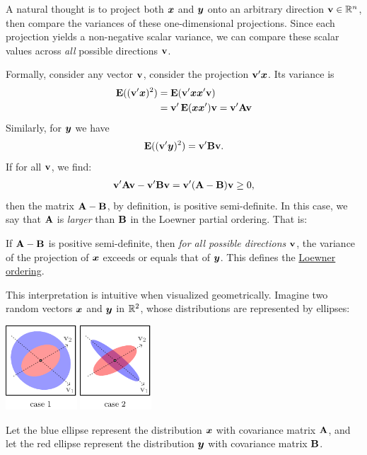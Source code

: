\documentclass[a4paper]{article}
\begin{document}
\begin{multicols}{2}
A natural thought is to project both $\xx$ and $\yy$ onto an arbitrary direction $\vv\in\reals^n$,
then compare the variances of these one-dimensional projections.
Since each projection yields a non-negative scalar variance,
we can compare these scalar values across \emph{all} possible directions $\vv$.

Formally, consider any vector $\vv$,
consider the projection $\vv\T\xx$.
Its variance is
\begin{align*}
	\E((\vv\T \xx)^2)
	&= \E(\vv\T \xx\xx\T\vv) \\
	&= \vv\T\E(\xx\xx\T)\vv
	= \vv\T \AA\vv
\end{align*}
Similarly, for $\yy$ we have
\begin{align*}
	\E((\vv\T \yy)^2)
	= \vv\T \BB\vv.
\end{align*}
If for all $\vv$, we find:
\begin{align*}
	\vv\T \AA\vv - \vv\T \BB\vv
	= \vv\T (\AA - \BB)\vv
	\geq 0,
\end{align*}
then the matrix $\AA-\BB$, by definition, is positive semi-definite.
In this case, we say that $\AA$ is \emph{larger} than $\BB$ in the Loewner partial ordering. That is:
\begin{tcolorbox}[enhanced,sharp corners,frame hidden,boxrule=0sp,borderline west={3pt}{0pt}{black!70}]
	If $\AA-\BB$ is positive semi-definite,
	then \emph{for all possible directions $\vv$},
	the variance of the projection of $\xx$ exceeds or equals that of $\yy$.
	This defines the \href{https://en.wikipedia.org/wiki/Loewner_order}{Loewner ordering}.
\end{tcolorbox}

This interpretation is intuitive when visualized geometrically.
Imagine two random vectors $\xx$ and $\yy$ in $\reals^2$, whose distributions are represented by ellipses:
\begin{center}
	\includegraphics[width=0.2\textwidth]{figures/visual-1.pdf}
	\hspace{0.5em}
	\includegraphics[width=0.2\textwidth]{figures/visual-2.pdf}
\end{center}
Let the blue ellipse represent the distribution $\xx$ with covariance matrix $\AA$,
and let the red ellipse represent the distribution $\yy$ with covariance matrix $\BB$.


\end{multicols}
\end{document}
